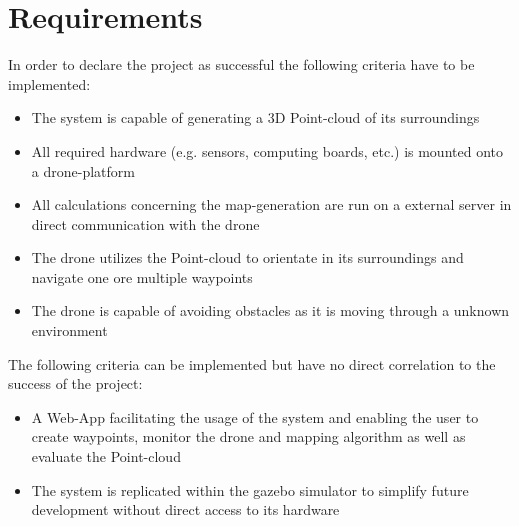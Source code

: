 \section{Requirements}
In order to declare the project as successful the following criteria have to be implemented:
\begin{itemize}
	\item The system is capable of generating a 3D Point-cloud of its surroundings
	\item All required hardware (e.g. sensors, computing boards, etc.) is mounted onto a drone-platform 
	\item All calculations concerning the map-generation are run on a external server in direct communication with the drone
	\item The drone utilizes the Point-cloud to orientate in its surroundings and navigate one ore multiple waypoints
	\item The drone is capable of avoiding obstacles as it is moving through a unknown environment
\end{itemize}

The following criteria can be implemented but have no direct correlation to the success of the project:
\begin{itemize}
	\item A Web-App facilitating the usage of the system and enabling the user to create waypoints, monitor the drone and mapping algorithm as well as evaluate the Point-cloud
	\item The system is replicated within the gazebo simulator to simplify future development without direct access to its hardware
\end{itemize}


\filbreak
